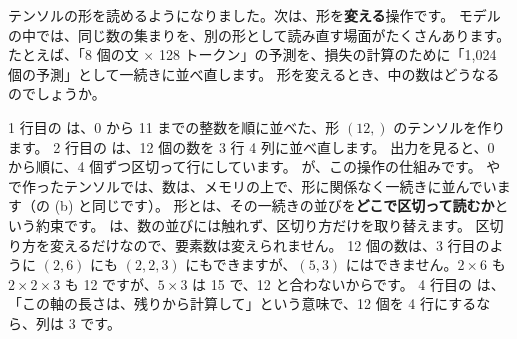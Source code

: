 テンソルの形を読めるようになりました。次は、形を\textbf{変える}操作です。
モデルの中では、同じ数の集まりを、別の形として読み直す場面がたくさんあります。
たとえば、「8 個の文 $\times$ 128 トークン」の予測を、損失の計算のために「1,024 個の予測」として一続きに並べ直します。
形を変えるとき、中の数はどうなるのでしょうか。



1 行目の  は、0 から 11 までの整数を順に並べた、形 $(12,)$ のテンソルを作ります。
2 行目の  は、12 個の数を 3 行 4 列に並べ直します。
出力を見ると、0 から順に、4 個ずつ区切って行にしています。
が、この操作の仕組みです。
 や  で作ったテンソルでは、数は、メモリの上で、形に関係なく一続きに並んでいます（の (b) と同じです）。
形とは、その一続きの並びを\textbf{どこで区切って読むか}という約束です。
 は、数の並びには触れず、区切り方だけを取り替えます。
区切り方を変えるだけなので、要素数は変えられません。
12 個の数は、3 行目のように $(2,6)$ にも $(2,2,3)$ にもできますが、$(5,3)$ にはできません。$2\times 6$ も $2\times 2\times 3$ も 12 ですが、$5\times 3$ は 15 で、12 と合わないからです。
4 行目の  は、「この軸の長さは、残りから計算して」という意味で、12 個を 4 行にするなら、列は 3 です。

